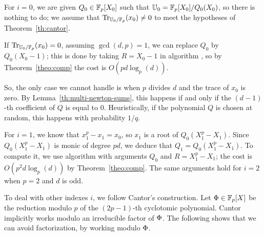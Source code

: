 For $i=0$, we are given $Q_0\in\mathbb{F}_p[X_0]$ such that
$\mathbb{U}_0=\mathbb{F}_p[X_0]/Q_0(X_0)$, so there is nothing to do; we assume that
$\operatorname{Tr}_{\mathbb{U}_0/\mathbb{F}_p}(x_0)\ne0$ to meet the hypotheses of
Theorem~\ref{th:cantor}. 

\begin{remark}
  If $\operatorname{Tr}_{\mathbb{U}_0/\mathbb{F}_p}(x_0)=0$, assuming $\gcd(d,p)=1$, we can replace
  $Q_0$ by $Q_0(X_0-1)$; this is done by taking $R=X_0-1$ in algorithm
  , so by Theorem~\ref{theo:comp} the cost is $O(pd
  \log_p(d))$.

  So, the only case we cannot handle is when $p$ divides $d$ and the
  trace of $x_0$ is zero. By Lemma~\ref{th:multi-newton-sums}, this
  happens if and only if the $(d-1)$-th coefficient of $Q$ is equal to
  $0$. Heuristically, if the polynomial $Q$ is chosen at random, this
  happens with probability $1/q$.
\end{remark}

For $i=1$, we know that $x_1^p-x_1=x_0$, so $x_1$ is a root of
$Q_0(X_1^p-X_1)$. Since $Q_0(X_1^p-X_1)$ is monic of degree $pd$, we
deduce that $Q_1=Q_0(X_1^p-X_1)$. To compute it, we use algorithm
 with arguments $Q_0$ and $R=X_1^p-X_1$; the cost is
$O(p^2d \log_p(d))$ by Theorem~\ref{theo:comp}. The same arguments
hold for $i=2$ when $p=2$ and $d$ is odd.

To deal with other indexes $i$, we follow Cantor's construction.  Let
$\Phi\in \mathbb{F}_p[X]$ be the reduction modulo $p$ of the $(2p-1)$-th
cyclotomic polynomial. Cantor implicitly works modulo an irreducible
factor of $\Phi$. The following shows that we can avoid
factorization, by working modulo $\Phi$.

